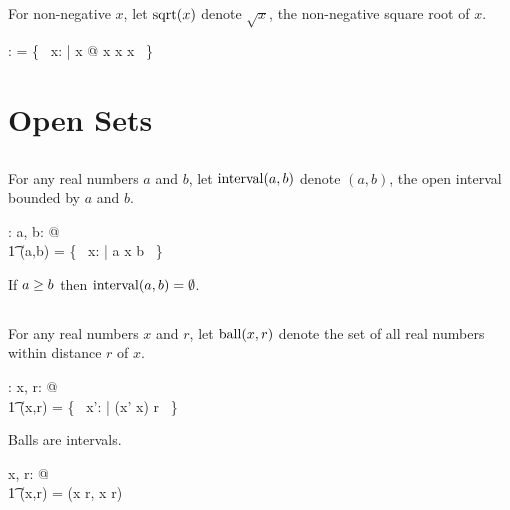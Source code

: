 \documentclass[11pt, oneside]{article}
\begin{document}
\subsection{}

For non-negative $x$, let $\operatorname{sqrt}(x)$ denote $\sqrt{x}$, the non-negative square root of $x$.

\begin{axdef}
	\sqrtR: \R \pfun \R
\where
	\sqrtR = \{~ x: \R | x \geR \zeroR @ x \mulR x \mapsto x ~\}
\end{axdef}

\section{Open Sets}

\subsection{}

For any real numbers $a$ and $b$, let $\operatorname{interval}(a,b)$ denote $(a,b)$, the open interval bounded by $a$ and $b$.

\begin{axdef}
	\intervalR: \R \cross \R \fun \power \R
\where
	\forall a, b: \R @ \\
	\t1	\intervalR(a,b) = \{~ x: \R | a \ltR x \ltR b ~\}
\end{axdef}

\begin{remark}
If $a \mathrel{\geq} b$ then $\operatorname{interval}(a,b) = \emptyset$.
\end{remark}

\subsection{}

For any real numbers $x$ and $r$, let $\operatorname{ball}(x,r)$ denote the set of all real numbers within distance $r$ of $x$.

\begin{axdef}
	\ballR: \R \cross \R \fun \power \R
\where
	\forall x, r: \R @ \\
	\t1	\ballR(x,r) = \{~ x': \R | \absR(x' \subR x) \ltR r ~\}
\end{axdef}

\begin{remark}
Balls are intervals.

\begin{zed}
	\forall x, r: \R @ \\
	\t1	\ballR(x,r) = \intervalR(x \subR r, x \addR r)
\end{zed}

\end{remark}
\end{document}
